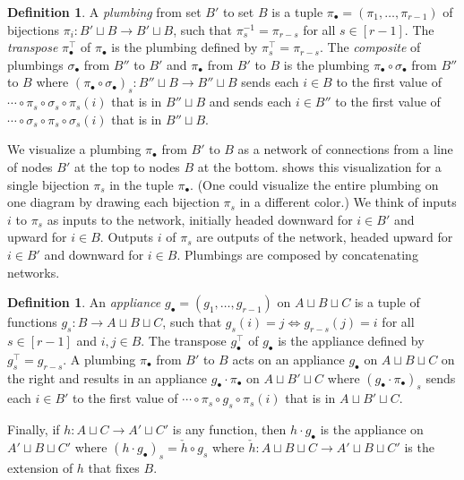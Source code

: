 \documentclass{amsart}
\theoremstyle{definition}
\newtheorem{definition}[theorem]{Definition}
\theoremstyle{remark}
\numberwithin{equation}{section}
\begin{document}
\begin{definition}
\label{def:plumbing}
  A \emph{plumbing} from set $B'$ to set $B$ is a tuple $\pi_\bullet = (\pi_1, \ldots, \pi_{r-1})$ of bijections $\pi_i \colon B' \sqcup B \to B' \sqcup B$, such that $\pi_s^{-1} = \pi_{r-s}$ for all $s \in [r-1]$. The \emph{transpose} $\pi_\bullet^\top$ of $\pi_\bullet$ is the plumbing defined by $\pi_s^\top = \pi_{r-s}$. The \emph{composite} of plumbings $\sigma_\bullet$ from $B''$ to $B'$ and $\pi_\bullet$ from $B'$ to $B$ is the plumbing $\pi_\bullet \circ \sigma_\bullet$ from $B''$ to $B$ where $(\pi_\bullet \circ \sigma_\bullet)_s \colon B'' \sqcup B \to B'' \sqcup B$ sends each $i \in B$ to the first value of $\cdots \circ \pi_s \circ \sigma_s \circ \pi_s(i)$ that is in $B'' \sqcup B$ and  sends each $i \in B''$ to the first value of $\cdots \circ \sigma_s \circ \pi_s \circ \sigma_s(i)$ that is in $B'' \sqcup B$.
\end{definition}

We visualize a plumbing $\pi_{\bullet}$  from $B'$ to $B$ as a network of connections from a line of nodes $B'$ at the top to nodes $B$ at the bottom.  shows this visualization for a single bijection $\pi_s$ in the tuple $\pi_{\bullet}$.  (One could visualize the entire plumbing on one diagram by drawing each bijection $\pi_s$ in a different color.)  We think of inputs $i$ to $\pi_s$ as inputs to the network, initially headed downward for $i \in B'$ and upward for $i \in B$. Outputs $i$ of $\pi_s$ are outputs of the network, headed upward for $i \in B'$ and downward for $i \in B$. Plumbings are composed by concatenating networks.

\begin{definition}
\label{def:appliance}
  An \emph{appliance} $g_\bullet = (g_1, \ldots, g_{r-1})$ on $A \sqcup B \sqcup C$ is a tuple of functions $g_s \colon B \to A \sqcup B \sqcup C$, such that $g_s(i) = j \Leftrightarrow g_{r-s}(j) = i$ for all $s \in [r-1]$ and $i, j \in B$. The transpose $g_\bullet^\top$ of $g_\bullet$ is the appliance defined by $g_s^\top = g_{r-s}$. A plumbing $\pi_\bullet$ from $B'$ to $B$ acts on an appliance $g_\bullet$ on $A \sqcup B \sqcup C$ on the right and results in an appliance $g_\bullet \cdot \pi_\bullet$ on $A \sqcup B' \sqcup C$ where $(g_\bullet \cdot \pi_\bullet)_s$ sends each $i \in B'$ to the first value of $\cdots \circ \pi_s \circ g_s \circ \pi_s(i)$ that is in $A \sqcup B' \sqcup C$.

  Finally, if $h \colon A \sqcup C \to A' \sqcup C'$ is any function, then $h \cdot g_\bullet$ is the appliance on $A' \sqcup B \sqcup C'$ where $(h \cdot g_\bullet)_s = \check{h} \circ g_s$ where $\check{h} \colon A \sqcup B \sqcup C \to A' \sqcup B \sqcup C'$ is the extension of $h$ that fixes $B$.
\end{definition}
\end{document}
